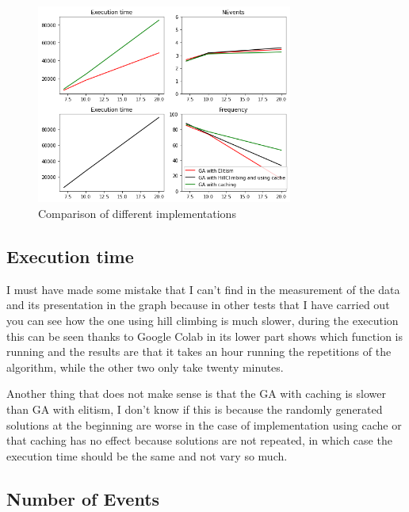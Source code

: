 \documentclass{article}
\begin{document}
    \begin{figure}[H]

        \centering
        \includegraphics[width=0.75\textwidth]{../media/descarga.png}
        \caption{Comparison of different implementations}
        \label{Comparison of different implementations}

    \end{figure}

    \subsection{Execution time}

    I must have made some mistake that I can't find in the measurement of the data and its presentation 
    in the graph because in other tests that I have carried out you can see how the one using hill climbing 
    is much slower, during the execution this can be seen thanks to Google Colab in its lower part shows which 
    function is running and the results are that it takes an hour running the repetitions of the algorithm, 
    while the other two only take twenty minutes.

    Another thing that does not make sense is that the GA with caching is slower than GA with elitism, 
    I don't know if this is because the randomly generated solutions at the beginning are worse in the 
    case of implementation using cache or that caching has no effect because solutions are not repeated, 
    in which case the execution time should be the same and not vary so much.

    \subsection{Number of Events}
\end{document}
